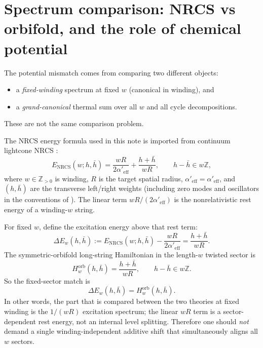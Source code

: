 \documentclass[11pt]{article}
\newcommand{\Aeff}{\alpha'_{\mathrm{eff}}}
\begin{document}
\section{Spectrum comparison: NRCS vs orbifold, and the role of chemical potential}
The potential mismatch comes from comparing two different objects:
\begin{itemize}
\item a \emph{fixed-winding} spectrum at fixed $w$ (canonical in winding), and
\item a \emph{grand-canonical} thermal sum over all $w$ and all cycle decompositions.
\end{itemize}
These are not the same comparison problem.

The NRCS energy formula used in this note is imported from continuum lightcone NRCS \cite{gomis2000nonrelativisticclosedstringtheory}:
\begin{equation}
E_{\mathrm{NRCS}}(w;h,\bar h)
=
\frac{wR}{2\Aeff}+\frac{h+\bar h}{wR},
\qquad
h-\bar h\in w\mathbb Z,
\end{equation}
where $w\in \mathbb Z_{>0}$ is winding, $R$ is the target spatial radius, $\Aeff=\alpha'_{\mathrm{eff}}$, and $(h,\bar h)$ are the transverse left/right weights (including zero modes and oscillators in the conventions of \cite{gomis2000nonrelativisticclosedstringtheory}).
The linear term $wR/(2\Aeff)$ is the nonrelativistic rest energy of a winding-$w$ string.

For fixed $w$, define the excitation energy above that rest term:
\begin{equation}\label{eq:fixed-w-excitation-energy}
\Delta E_w(h,\bar h)
:=
E_{\mathrm{NRCS}}(w;h,\bar h)-\frac{wR}{2\Aeff}
=
\frac{h+\bar h}{wR}.
\end{equation}
The symmetric-orbifold long-string Hamiltonian in the length-$w$ twisted sector is
\begin{equation}\label{eq:orbifold-length-w-hamiltonian}
H^{\mathrm{orb}}_w(h,\bar h)=\frac{h+\bar h}{wR},
\qquad
h-\bar h\in w\mathbb Z.
\end{equation}
So the fixed-sector match is
\begin{equation}
\Delta E_w(h,\bar h)=H^{\mathrm{orb}}_w(h,\bar h).
\end{equation}
In other words, the part that is compared between the two theories at fixed winding is the $1/(wR)$ excitation spectrum; the linear $wR$ term is a sector-dependent rest energy, not an internal level splitting. Therefore one should \emph{not} demand a single winding-independent additive shift that simultaneously aligns all $w$ sectors.
\end{document}
